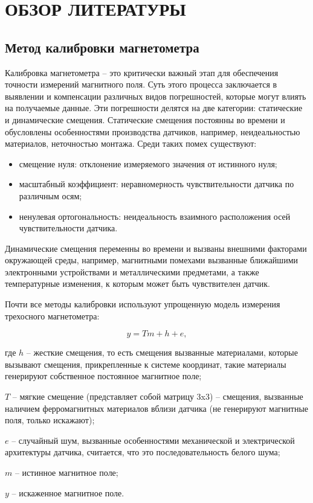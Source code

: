 \section{ОБЗОР ЛИТЕРАТУРЫ}
\label{sec:domain}


\subsection{Метод калибровки магнетометра}
Калибровка магнетометра -- это критически важный этап для обеспечения точности измерений магнитного поля. 
Суть этого процесса заключается в выявлении и компенсации различных видов погрешностей, которые могут 
влиять на получаемые данные. Эти погрешности делятся на две категории: статические и динамические смещения.
Статические смещения постоянны во времени и обусловлены особенностями производства датчиков, например,
неидеальностью материалов, неточностью монтажа. Среди таких помех существуют: 
\begin{itemize}
    \item смещение нуля: отклонение измеряемого значения от истинного нуля;
    \item масштабный коэффициент: неравномерность чувствительности датчика по различным осям;
    \item ненулевая ортогональность: неидеальность взаимного расположения осей чувствительности датчика.
\end{itemize}

Динамические смещения переменны во времени и вызваны внешними факторами окружающей среды, например, магнитными помехами
вызванные ближайшими электронными устройствами и металлическими предметами, 
а также температурные изменения, к которым может быть чувствителен датчик.

Почти все методы калибровки используют упрощенную модель измерения трехосного магнетометра:

\begin{equation}
    \label{eq:domain:magnetModel}
    y = Tm+h+e,
  \end{equation}
  \begin{explanationx}
    \item[где] $h$ -- жесткие смещения, то есть смещения вызванные материалами, которые вызывают смещения, прикрепленные к системе координат, такие материалы генерируют собственное  постоянное магнитное поле;
    \item      $T$ -- мягкие смещение (представляет собой матрицу 3x3) -- смещения, вызванные наличием ферромагнитных материалов вблизи датчика (не генерируют магнитные поля, только искажают);
    \item      $e$ -- случайный шум, вызванные особенностями механической и электрической архитектуры датчика, считается, что это последовательность белого шума;
    \item      $m$ -- истинное магнитное поле;
    \item      $y$ -- искаженное магнитное поле.
  \end{explanationx}

